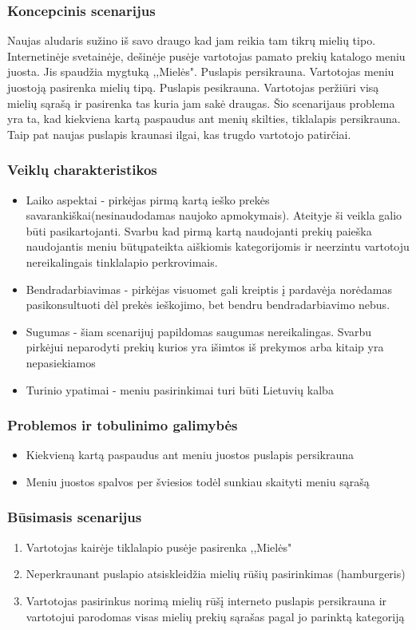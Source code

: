 \documentclass[oneside]{VUMIFPSkursinis}
\begin{document}
		\subsubsection{Koncepcinis scenarijus}
			Naujas aludaris sužino iš savo draugo kad jam reikia tam tikrų mielių tipo.
			Internetinėje svetainėje, dešinėje pusėje vartotojas pamato prekių katalogo meniu juosta.
			Jis spaudžia mygtuką ,,Mielės".
			Puslapis persikrauna.
			Vartotojas meniu juostoją pasirenka mielių tipą.
			Puslapis pesikrauna.
			Vartotojas peržiūri visą mielių sąrašą ir pasirenka tas kuria jam sakė draugas.
			Šio scenarijaus problema yra ta, kad kiekviena kartą paspaudus ant menių skilties, tiklalapis persikrauna.
			Taip pat naujas puslapis kraunasi ilgai, kas trugdo vartotojo patirčiai.
		\subsubsection{Veiklų charakteristikos}
			\begin{itemize}
				\item{Laiko aspektai - pirkėjas pirmą kartą ieško prekės savarankiškai(nesinaudodamas naujoko apmokymais).
					Ateityje ši veikla galio būti pasikartojanti.
					Svarbu kad pirmą kartą naudojanti prekių paieška naudojantis meniu būtųpateikta aiškiomis kategorijomis ir neerzintu vartotoju nereikalingais tinklalapio perkrovimais.}
				\item{Bendradarbiavimas - pirkėjas visuomet gali kreiptis į pardavėja norėdamas pasikonsultuoti dėl prekės ieškojimo, bet bendru bendradarbiavimo nebus.}
				\item{Sugumas - šiam scenarijuj papildomas saugumas nereikalingas.
					Svarbu pirkėjui neparodyti prekių kurios yra išimtos iš prekymos arba kitaip yra nepasiekiamos}
				\item{Turinio ypatimai - meniu pasirinkimai turi būti Lietuvių kalba}
			\end{itemize}
		\subsubsection{Problemos ir tobulinimo galimybės}
			\begin{itemize}
				\item{Kiekvieną kartą paspaudus ant meniu juostos puslapis persikrauna}
				\item{Meniu juostos spalvos per šviesios todėl sunkiau skaityti meniu sąrašą}
			\end{itemize}
		\subsubsection{Būsimasis scenarijus}
			\begin{enumerate}
				\item{Vartotojas kairėje tiklalapio pusėje pasirenka ,,Mielės"}
				\item{Neperkraunant puslapio atsiskleidžia mielių rūšių pasirinkimas (hamburgeris)}
				\item{Vartotojas pasirinkus norimą mielių rūšį interneto puslapis persikrauna ir vartotojui parodomas visas mielių prekių sąrašas pagal jo parinktą kategoriją}
			\end{enumerate}
\end{document}
